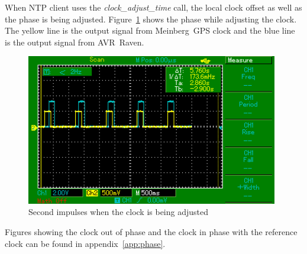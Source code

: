 When NTP client uses the {\it{clock\_adjust\_time}} call,
the local clock offset as well as the phase is being adjusted.
Figure~\ref{fig:measurements-osc-adjusting-phase} shows the phase while adjusting the clock.
The yellow line is the output signal from Meinberg~GPS clock
and the blue line is the output signal from AVR~Raven.
\begin{figure}[H]
  \centering
  \includegraphics[width=11cm,keepaspectratio]{fig/osc-adjusting-phase.png}
  \caption{Second impulses when the clock is being adjusted}
  \label{fig:measurements-osc-adjusting-phase}
\end{figure}
Figures showing the clock out of phase and the clock in phase with
the reference clock can be found in appendix~\ref{app:phase}.
